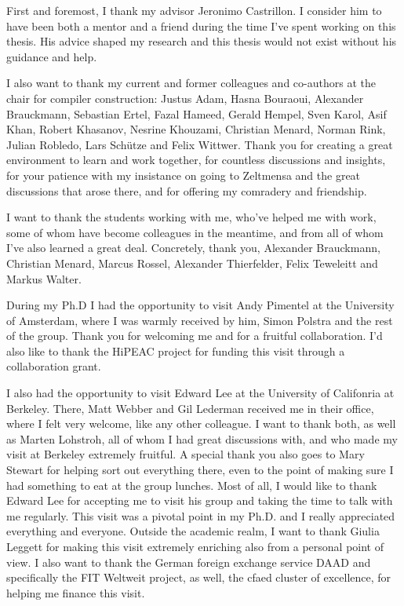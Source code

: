 First and foremost, I thank my advisor Jeronimo Castrillon.
I consider him to have been both a mentor and a friend during the time I've spent working on this thesis.
His advice shaped my research and this thesis would not exist without his guidance and help.

I also want to thank my current and former colleagues and co-authors at the chair for compiler construction:
Justus Adam, Hasna Bouraoui, Alexander Brauckmann, Sebastian Ertel, Fazal Hameed, Gerald Hempel, Sven Karol, Asif Khan, Robert Khasanov, Nesrine Khouzami, Christian Menard, Norman Rink, Julian Robledo, Lars Schütze and Felix Wittwer.
Thank you for creating a great environment to learn and work together, for countless discussions and insights, for your patience with my insistance on going to Zeltmensa and the great discussions that arose there, and for offering my comradery and friendship. 

I want to thank the students working with me, who've helped me with work, some of whom have become colleagues in the meantime, and from all of whom I've also learned a great deal.
Concretely, thank you, Alexander Brauckmann, Christian Menard, Marcus Rossel, Alexander Thierfelder, Felix Teweleitt and Markus Walter.

During my Ph.D I had the opportunity to visit Andy Pimentel at the University of Amsterdam, where I was warmly received by him, Simon Polstra and the rest of the group.
Thank you for welcoming me and for a fruitful collaboration. I'd also like to thank the HiPEAC project for funding this visit through a collaboration grant.

I also had the opportunity to visit Edward Lee at the University of Califonria at Berkeley. There, Matt Webber and Gil Lederman received me in their office, where I felt very welcome, like any other colleague.
I want to thank both, as well as Marten Lohstroh, all of whom I had great discussions with, and who made my visit at Berkeley extremely fruitful.
A special thank you also goes to Mary Stewart for helping sort out everything there, even to the point of making sure I had something to eat at the group lunches. 
Most of all, I would like to thank Edward Lee for accepting me to visit his group and taking the time to talk with me regularly.
This visit was a pivotal point in my Ph.D. and I really appreciated everything and everyone.
Outside the academic realm, I want to thank Giulia Leggett for making this visit extremely enriching also from a personal point of view.
I also want to thank the German foreign exchange service DAAD and specifically the FIT Weltweit project, as well, the \ac{cfaed} cluster of excellence, for helping me finance this visit.

